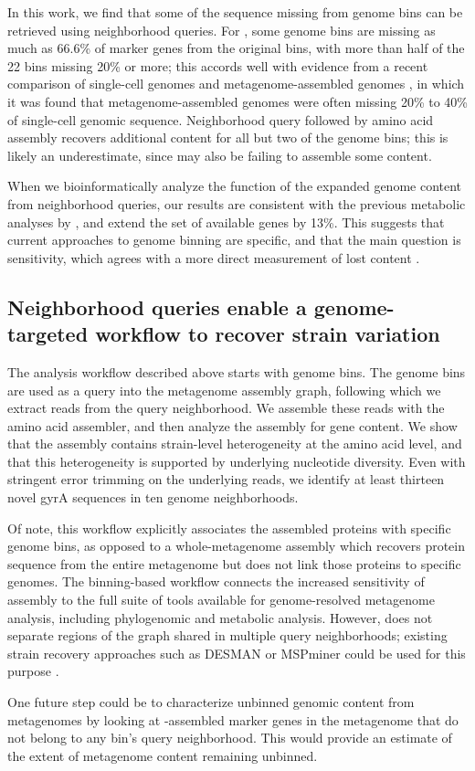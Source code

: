 In this work, we find that some of the sequence missing from genome
bins can be retrieved using neighborhood queries.  For \hu, some
genome bins are missing as much as 66.6\% of marker genes from the
original bins, with more than half of the 22 bins missing 20\% or
more; this accords well with evidence from a recent comparison of
single-cell genomes and metagenome-assembled genomes \cite{baltic}, in
which it was found that metagenome-assembled genomes were often
missing 20\% to 40\% of single-cell genomic sequence.  Neighborhood
query followed by amino acid assembly recovers additional content for
all but two of the genome bins; this is likely an underestimate, since
\plass may also be failing to assemble some content.

When we bioinformatically analyze the
function of the expanded genome content from neighborhood queries, our
results are consistent with the previous metabolic analyses by \cite{Hu2016}, and extend the
set of available genes by 13\%.
This suggests that current approaches to genome binning are specific,
and that the main question is sensitivity, which agrees with a more direct
measurement of lost content \cite{baltic}.

\subsection*{Neighborhood queries enable a genome-targeted workflow to recover strain variation}

The \sgc analysis workflow described above starts with genome bins. The
genome bins are used as a query into the metagenome assembly graph,
following which we extract reads from the query neighborhood.  We
assemble these reads with the \plass amino acid assembler, and then
analyze the assembly for gene content. We show that the \plass
assembly contains strain-level heterogeneity at the amino acid level,
and that this heterogeneity is supported by underlying nucleotide
diversity.  Even with stringent error trimming on the underlying
reads, we identify at least thirteen novel gyrA sequences in ten
genome neighborhoods.

Of note, this workflow explicitly associates the \plass assembled
proteins with specific genome bins, as opposed to a whole-metagenome
\plass assembly which recovers protein sequence from the entire
metagenome but does not link those proteins to specific genomes. The
binning-based workflow connects the increased sensitivity of \plass
assembly to the full suite of tools available for genome-resolved
metagenome analysis, including phylogenomic and metabolic
analysis. However, \sgc does not separate regions of the graph shared
in multiple query neighborhoods; existing
strain recovery approaches such as DESMAN or MSPminer could be used for this purpose
\cite{desman,mspminer}.

One future step could be to characterize unbinned genomic
content from metagenomes by looking at \plass-assembled marker genes
in the metagenome that do not belong to any bin's query neighborhood.
This would provide an estimate of the extent of
metagenome content remaining unbinned.
